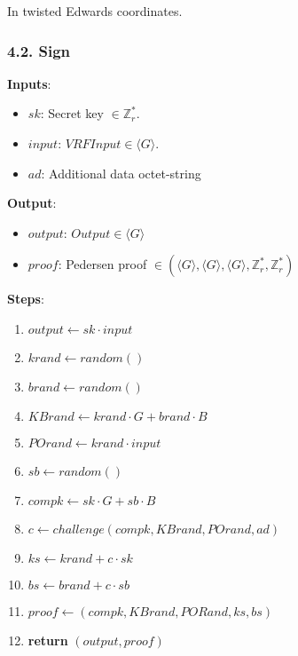 \documentclass[
]{article}
\providecommand{\tightlist}{%
  \setlength{\itemsep}{0pt}\setlength{\parskip}{0pt}}
\begin{document}
In twisted Edwards coordinates.

\hypertarget{sign-1}{%
\subsubsection{4.2. Sign}\label{sign-1}}

\textbf{Inputs}:

\begin{itemize}
\tightlist
\item
  \(sk\): Secret key \(\in \mathbb{Z}^*_r\).
\item
  \(input\): \(VRFInput \in \langle G \rangle\).
\item
  \(ad\): Additional data octet-string
\end{itemize}

\textbf{Output}:

\begin{itemize}
\tightlist
\item
  \(output\): \(Output \in \langle G \rangle\)
\item
  \(proof\): Pedersen proof
  \(\in (\langle G \rangle, \langle G \rangle, \langle G \rangle, \mathbb{Z}^*_r, \mathbb{Z}^*_r)\)
\end{itemize}

\textbf{Steps}:

\begin{enumerate}
\def\labelenumi{\arabic{enumi}.}
\tightlist
\item
  \(output \leftarrow sk \cdot input\)
\item
  \(krand \leftarrow random()\)
\item
  \(brand \leftarrow random()\)
\item
  \(KBrand \leftarrow krand \cdot G + brand \cdot B\)
\item
  \(POrand \leftarrow krand \cdot input\)
\item
  \(sb \leftarrow random()\)
\item
  \(compk \leftarrow sk \cdot G + sb \cdot B\)
\item
  \(c \leftarrow challenge(compk, KBrand, POrand, ad)\)
\item
  \(ks \leftarrow krand + c \cdot sk\)
\item
  \(bs \leftarrow brand + c \cdot sb\)
\item
  \(proof \leftarrow (compk, KBrand, PORand, ks, bs)\)
\item
  \textbf{return} \((output, proof)\)
\end{enumerate}
\end{document}
